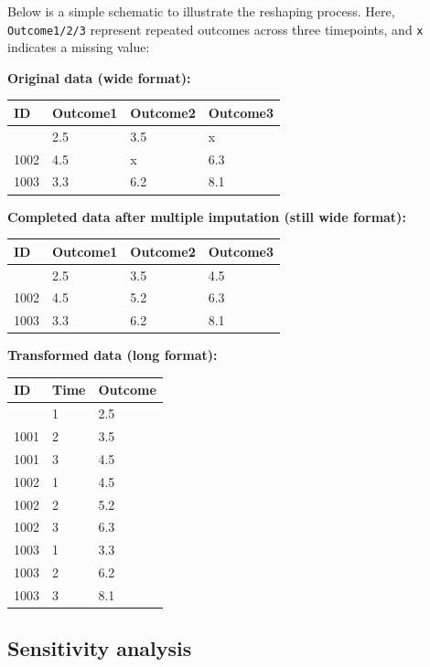 \documentclass{article}
\begin{document}
Below is a simple schematic to illustrate the reshaping process. Here,
\texttt{Outcome1/2/3} represent repeated outcomes across three
timepoints, and \texttt{x} indicates a missing value:

\textbf{Original data (wide format):}

\begin{longtable}[]{@{}llll@{}}
\toprule\noalign{}
ID & Outcome1 & Outcome2 & Outcome3 \\
\midrule\noalign{}
\endhead
\bottomrule\noalign{}
\endlastfoot
1001 & 2.5 & 3.5 & x \\
1002 & 4.5 & x & 6.3 \\
1003 & 3.3 & 6.2 & 8.1 \\
\end{longtable}

\textbf{Completed data after multiple imputation (still wide format):}

\begin{longtable}[]{@{}llll@{}}
\toprule\noalign{}
ID & Outcome1 & Outcome2 & Outcome3 \\
\midrule\noalign{}
\endhead
\bottomrule\noalign{}
\endlastfoot
1001 & 2.5 & 3.5 & 4.5 \\
1002 & 4.5 & 5.2 & 6.3 \\
1003 & 3.3 & 6.2 & 8.1 \\
\end{longtable}

\textbf{Transformed data (long format):}

\begin{longtable}[]{@{}lll@{}}
\toprule\noalign{}
ID & Time & Outcome \\
\midrule\noalign{}
\endhead
\bottomrule\noalign{}
\endlastfoot
1001 & 1 & 2.5 \\
1001 & 2 & 3.5 \\
1001 & 3 & 4.5 \\
1002 & 1 & 4.5 \\
1002 & 2 & 5.2 \\
1002 & 3 & 6.3 \\
1003 & 1 & 3.3 \\
1003 & 2 & 6.2 \\
1003 & 3 & 8.1 \\
\end{longtable}

\subsection{Sensitivity analysis}\label{sensitivity-analysis}
\end{document}
